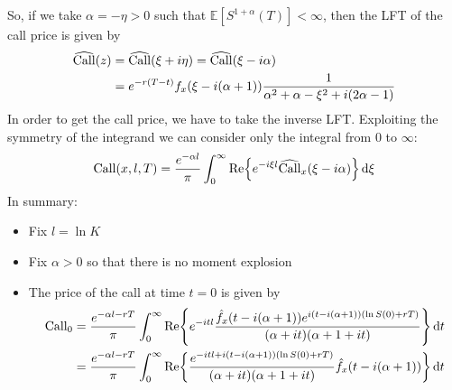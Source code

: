 So, if we take $\alpha = -\eta >0$ such that $\mathbb{E}[S^{1+\alpha}(T)]<\infty$, then the LFT of the call price is given by
\begin{align}
    \notag\widehat{\operatorname{Call}}(z) &= \widehat{\operatorname{Call}}(\xi+i\eta) = \widehat{\operatorname{Call}}(\xi-i\alpha) \\
    &=
    e^{-r(T-t)}f_x(\xi - i(\alpha+1))\frac{1}{\alpha^2+\alpha-\xi^2+i(2\alpha-1)}
\end{align}
In order to get the call price, we have to take the inverse LFT. Exploiting the symmetry of the integrand we can consider only the integral from $0$ to $\infty$:
\begin{align}
    \operatorname{Call}(x,l,T) = \frac{e^{-\alpha l}}{\pi}\int_0^{\infty} \Re{e^{-i\xi l}\widehat{\operatorname{Call}}_x(\xi-i\alpha)}\,\dd\xi
\end{align}
In summary:
\begin{itemize}
    \item Fix $l=\ln K$
    \item Fix $\alpha >0$ so that there is no moment explosion
    \item The price of the call at time $t=0$ is given by
    \begin{align}
        \notag\operatorname{Call}_0 &= \frac{e^{-\alpha l -rT}}{\pi}\int_0^{\infty} \Re{e^{-itl}\frac{\hat{f}_x(t-i(\alpha+1))e^{i(t-i(\alpha+1))(\ln S(0)+rT)}}{(\alpha+it)(\alpha+1+it)}}\,\dd t \\
        &=
        \frac{e^{-\alpha l -rT}}{\pi}
        \int_0^{\infty}
        \Re{
        \frac{
        e^{-itl+i(t-i(\alpha+1))(\ln S(0)+rT)}}{(\alpha+it)(\alpha+1+it)}
        \hat{f}_x(t-i(\alpha+1))
        }\,\dd t
    \end{align}
\end{itemize}
